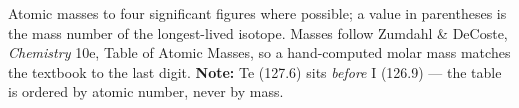\documentclass[10pt]{article}
\newlength{\ptW}\setlength{\ptW}{1.42cm}
\newlength{\ptH}\setlength{\ptH}{1.88cm}
\begin{document}
\begin{center}
\begin{tikzpicture}[x=\ptW,y=\ptH]
\end{tikzpicture}

\vspace{0.5em}
{\sffamily\fontsize{7.4}{9}\selectfont\color{apcgray}%
Atomic masses to four significant figures where possible; a value in
parentheses is the mass number of the longest-lived isotope. Masses follow
Zumdahl \& DeCoste, \emph{Chemistry} 10e, Table of Atomic Masses, so a
hand-computed molar mass matches the textbook to the last digit.\quad
\textbf{Note:} Te (127.6) sits \emph{before} I (126.9) --- the table is
ordered by atomic number, never by mass.\par}
\end{center}
\vspace*{\fill}
\end{document}
